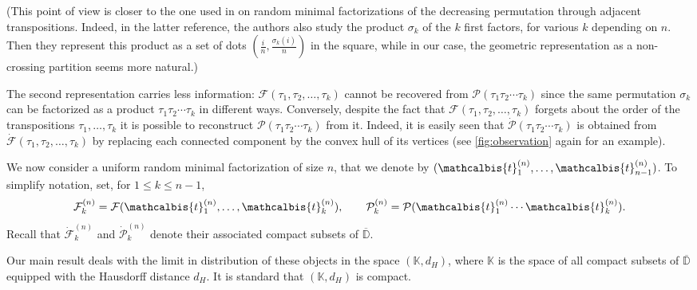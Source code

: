 \documentclass[10pt]{amsart}
\theoremstyle{definition}\newtheorem{defi}[theo]{Definition}\newtheorem{rema}[theo]{Remark}\newtheorem{exam}[theo]{Example}\newtheorem{exem}[theo]{Example}\newtheorem{nota}[theo]{Notation}
\newcommand{\D}{\mathbb{D}}
\def\PPP{\mathcal P}
\def\FFF{\mathcal F}
\def\tb{\mathcalbis{t}}
\begin{document}
(This point of view is closer to the one used in \cite{AHRV07} on random minimal factorizations
of the decreasing permutation through adjacent transpositions.
Indeed, in the latter reference, the authors also study the product $\sigma_k$ of the $k$ first factors, for various $k$ depending on $n$.
Then they represent this product as a set of dots $(\tfrac{i}{n},\tfrac{\sigma_k(i)}{n})$ in the square,
while in our case, the geometric representation as a non-crossing partition seems more natural.)

The second representation carries less information:
$\FFF(\tau_{1}, \tau_{2}, \ldots, \tau_{k})$ cannot be recovered from $\PPP(\tau_{1} \tau_{2}\cdots \tau_{k})$
since the same permutation $\sigma_k$ can be factorized as a product $\tau_{1} \tau_{2}\cdots \tau_{k}$ in different ways.
Conversely, despite the fact that $\FFF(\tau_{1}, \tau_{2}, \ldots, \tau_{k})$ forgets about
the order of the transpositions $\tau_1,\dots,\tau_k$ it is possible to reconstruct $\PPP(\tau_{1} \tau_{2}\cdots \tau_{k})$
from it.
Indeed,
it is easily seen that $ \dot{\PPP}(\tau_{1} \tau_{2}\cdots \tau_{k})$ is obtained from
$\dot{\FFF}(\tau_{1} ,\tau_{2} ,\ldots ,\tau_{k})$ by replacing each connected component by the convex hull of its vertices (see \cref{fig:observation} again for an example).

We now consider a uniform random minimal factorization of size $n$, that we denote by
$(\tb_{1}^{(n)}, \ldots, \tb_{n-1}^{(n)})$.
To simplify notation, set, for $1 \leq k \leq n-1$,
\[ \FFF^{(n)}_{k}= \FFF ( \tb_{1}^{(n)}, \ldots, \tb_{k}^{(n)} ), \qquad  \PPP^{(n)}_{k}= \PPP ( \tb_{1}^{(n)}  \cdots \tb_{k}^{(n)} ).\]
Recall that  $\dot{\FFF}^{(n)}_{k}$ and $ \dot{\PPP}^{(n)}_{k}$ denote their associated compact subsets of $\overline{\D}$.

Our main result deals with the limit in distribution of these objects in the space  $(\mathbb{K},d_{H})$, where  $\mathbb{K}$ is the space of all compact subsets of $\overline{\D}$  equipped with the Hausdorff distance $d_{H}$. It is standard that $(\mathbb{K},d_{H})$ is compact.
\end{document}
